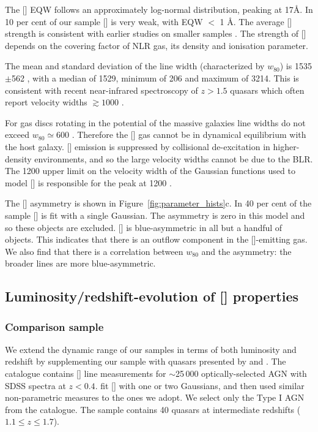 The [] EQW follows an approximately log-normal distribution, peaking at 17\AA. 
In 10 per cent of our sample [] is very weak, with EQW $<$ 1 \AA. 
The average [] strength is consistent with earlier studies on smaller samples \citep[e.g.][]{sulentic04,netzer04,shen16a}.
The strength of [] depends on the covering factor of NLR gas, its density and ionisation parameter. 

The mean and standard deviation of the line width (characterized by $w_{80}$) is 1535$\pm$562 \kms, with a median of 1529, minimum of 206 and maximum of 3214. 
This is consistent with recent near-infrared spectroscopy of $z>1.5$ quasars which often report velocity widths $\gtrsim1000$ \kms \citep[e.g.][]{netzer04,kim13,brusa15,shen16a}. 

For gas discs rotating in the potential of the massive galaxies line widths do not exceed $w_{80}\simeq600$ \kms \citep{liu13}. 
Therefore the [] gas cannot be in dynamical equilibrium with the host galaxy. 
[] emission is suppressed by collisional de-excitation in higher-density environments, and so the large velocity widths cannot be due to the BLR. 
The 1200 \kms upper limit on the velocity width of the Gaussian functions used to model [] is responsible for the peak at 1200 \kms. 

The [] asymmetry is shown in Figure~\ref{fig:parameter_hists}c. 
In 40 per cent of the sample [] is fit with a single Gaussian. 
The asymmetry is zero in this model and so these objects are excluded. 
[] is blue-asymmetric in all but a handful of objects. 
This indicates that there is an outflow component in the []-emitting gas. 
We also find that there is a correlation between $w_{80}$ and the asymmetry: the broader lines are more blue-asymmetric.

\subsection{Luminosity/redshift-evolution of [] properties}

\subsubsection{Comparison sample}

We extend the dynamic range of our samples in terms of both luminosity and redshift by supplementing our sample with quasars presented by \citet{mullaney13} and \citet{harrison16}. 
The \citet{mullaney13} catalogue contains [] line measurements for $\sim$25\,000 optically-selected AGN with SDSS spectra at $z<0.4$.
\citet{mullaney13} fit [] with one or two Gaussians, and then used similar non-parametric measures to the ones we adopt.
We select only the Type I AGN from the \citet{mullaney13} catalogue. 
The \citet{harrison16} sample contains 40 quasars at intermediate redshifts ($1.1 \leq z \leq 1.7$).

